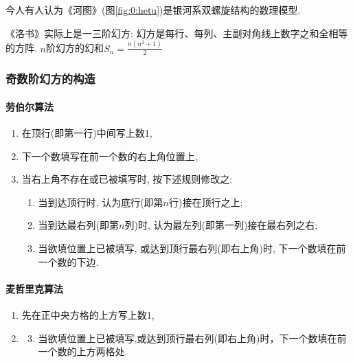         今人有人认为《河图》(图\ref{fig:0:hetu})是银河系双螺旋结构的数理模型.

        《洛书》实际上是一三阶幻方: \textsf{幻方}是每行、每列、主副对角线上数字之和全相等的方阵. $n$阶幻方的\textsf{幻和}$S_n=\frac{n(n^2+1)}{2}$

        \subsubsection{奇数阶幻方的构造}

            \paragraph{劳伯尔算法}

                \begin{enumerate}
                    \item 在顶行(即第一行)中间写上数1,
                    \item 下一个数填写在前一个数的右上角位置上,
                    \item 当右上角不存在或已被填写时, 按下述规则修改之:
                        \begin{enumerate}
                            \item 当到达顶行时, 认为底行(即第$n$行)接在顶行之上;
                            \item 当到达最右列(即第$n$列)时, 认为最左列(即第一列)接在最右列之右;
                            \item 当欲填位置上已被填写, 或达到顶行最右列(即右上角)时, 下一个数填在前一个数的下边.
                        \end{enumerate}
                \end{enumerate}

            \paragraph{麦哲里克算法}

                \begin{enumerate}
                    \item 先在正中央方格的上方写上数1,
                    \setcounter{enumi}{2}
                    \item 
                        \begin{enumerate}
                            \setcounter{enumii}{2}
                            \item 当欲填位置上已被填写,或达到顶行最右列(即右上角)时，下一个数填在前一个数的上方两格处.
                        \end{enumerate}
                \end{enumerate}


